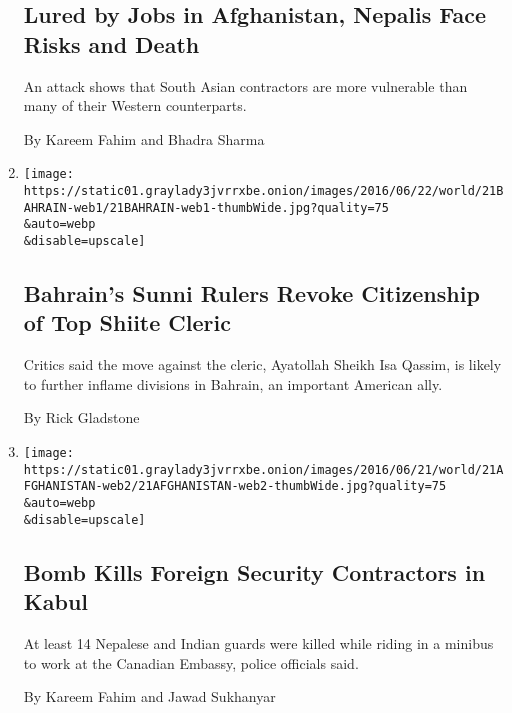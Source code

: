 \begin{enumerate}
  \hypertarget{lured-by-jobs-in-afghanistan-nepalis-face-risks-and-death}{%
  \subsection{Lured by Jobs in Afghanistan, Nepalis Face Risks and
  Death}\label{lured-by-jobs-in-afghanistan-nepalis-face-risks-and-death}}

  An attack shows that South Asian contractors are more vulnerable than
  many of their Western counterparts.

  By Kareem Fahim and Bhadra Sharma
\item
  \href{/2016/06/21/world/middleeast/bahrains-sunni-rulers-revoke-citizenship-of-top-shiite-cleric.html}{}

  \texttt{[image: https://static01.graylady3jvrrxbe.onion/images/2016/06/22/world/21BAHRAIN-web1/21BAHRAIN-web1-thumbWide.jpg?quality=75\\\&auto=webp\\\&disable=upscale]}

  \hypertarget{bahrains-sunni-rulers-revoke-citizenship-of-top-shiite-cleric}{%
  \subsection{Bahrain's Sunni Rulers Revoke Citizenship of Top Shiite
  Cleric}\label{bahrains-sunni-rulers-revoke-citizenship-of-top-shiite-cleric}}

  Critics said the move against the cleric, Ayatollah Sheikh Isa Qassim,
  is likely to further inflame divisions in Bahrain, an important
  American ally.

  By Rick Gladstone
\item
  \href{/2016/06/21/world/asia/afghanistan-kabul-suicide-attack.html}{}

  \texttt{[image: https://static01.graylady3jvrrxbe.onion/images/2016/06/21/world/21AFGHANISTAN-web2/21AFGHANISTAN-web2-thumbWide.jpg?quality=75\\\&auto=webp\\\&disable=upscale]}

  \hypertarget{bomb-kills-foreign-security-contractors-in-kabul}{%
  \subsection{Bomb Kills Foreign Security Contractors in
  Kabul}\label{bomb-kills-foreign-security-contractors-in-kabul}}

  At least 14 Nepalese and Indian guards were killed while riding in a
  minibus to work at the Canadian Embassy, police officials said.

  By Kareem Fahim and Jawad Sukhanyar
\end{enumerate}

